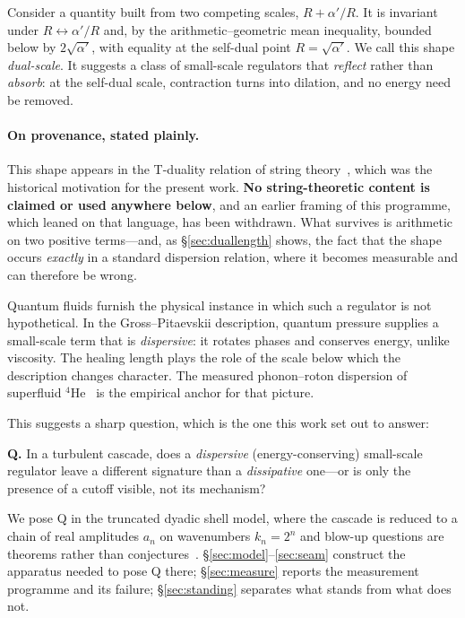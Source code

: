 \documentclass[11pt,a4paper]{article}
\theoremstyle{definition}
\theoremstyle{remark}
\begin{document}
Consider a quantity built from two competing scales, $R + \alpha'/R$. It is invariant
under $R \leftrightarrow \alpha'/R$ and, by the arithmetic--geometric mean inequality,
bounded below by $2\sqrt{\alpha'}$, with equality at the self-dual point
$R = \sqrt{\alpha'}$. We call this shape \emph{dual-scale}. It suggests a class of
small-scale regulators that \emph{reflect} rather than \emph{absorb}: at the self-dual
scale, contraction turns into dilation, and no energy need be removed.

\paragraph{On provenance, stated plainly.} This shape appears in the T-duality relation of
string theory~\cite{GPR1994}, which was the historical motivation for the present work.
\textbf{No string-theoretic content is claimed or used anywhere below}, and an earlier
framing of this programme, which leaned on that language, has been withdrawn. What
survives is arithmetic on two positive terms---and, as \S\ref{sec:duallength} shows, the
fact that the shape occurs \emph{exactly} in a standard dispersion relation, where it
becomes measurable and can therefore be wrong.

Quantum fluids furnish the physical instance in which such a regulator is not
hypothetical. In the Gross--Pitaevskii description, quantum pressure supplies a
small-scale term that is \emph{dispersive}: it rotates phases and conserves energy,
unlike viscosity. The healing length plays the role of the scale below which the
description changes character. The measured phonon--roton dispersion of superfluid
$^4$He~\cite{Godfrin2021,GodfrinKrotscheck2022} is the empirical anchor for that picture.

This suggests a sharp question, which is the one this work set out to answer:

\begin{keybox}
\textbf{Q.} In a turbulent cascade, does a \emph{dispersive} (energy-conserving)
small-scale regulator leave a different signature than a \emph{dissipative} one---or is
only the presence of a cutoff visible, not its mechanism?
\end{keybox}

We pose Q in the truncated dyadic shell model, where the cascade is reduced to a chain of
real amplitudes $a_n$ on wavenumbers $k_n = 2^n$ and blow-up questions are theorems rather
than conjectures~\cite{KatzPavlovic2005}. \S\ref{sec:model}--\ref{sec:seam} construct the
apparatus needed to pose Q there; \S\ref{sec:measure} reports the measurement programme
and its failure; \S\ref{sec:standing} separates what stands from what does not.
\end{document}
